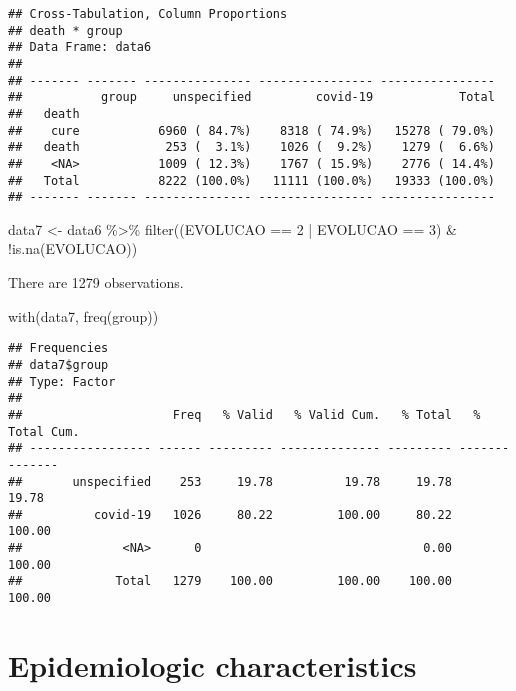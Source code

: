 \documentclass[
]{article}
\newenvironment{Shaded}{\begin{snugshade}}{\end{snugshade}}
\newcommand{\DecValTok}[1]{\textcolor[rgb]{0.00,0.00,0.81}{#1}}
\newcommand{\FunctionTok}[1]{\textcolor[rgb]{0.00,0.00,0.00}{#1}}
\newcommand{\NormalTok}[1]{#1}
\newcommand{\OtherTok}[1]{\textcolor[rgb]{0.56,0.35,0.01}{#1}}
\newcommand{\SpecialCharTok}[1]{\textcolor[rgb]{0.00,0.00,0.00}{#1}}
\begin{document}
\begin{verbatim}
## Cross-Tabulation, Column Proportions  
## death * group  
## Data Frame: data6  
## 
## ------- ------- --------------- ---------------- ----------------
##           group     unspecified         covid-19            Total
##   death                                                          
##    cure           6960 ( 84.7%)    8318 ( 74.9%)   15278 ( 79.0%)
##   death            253 (  3.1%)    1026 (  9.2%)    1279 (  6.6%)
##    <NA>           1009 ( 12.3%)    1767 ( 15.9%)    2776 ( 14.4%)
##   Total           8222 (100.0%)   11111 (100.0%)   19333 (100.0%)
## ------- ------- --------------- ---------------- ----------------
\end{verbatim}

\begin{Shaded}
\begin{Highlighting}[]
\NormalTok{data7 }\OtherTok{\textless{}{-}}\NormalTok{ data6 }\SpecialCharTok{\%\textgreater{}\%} 
  \FunctionTok{filter}\NormalTok{((EVOLUCAO }\SpecialCharTok{==} \DecValTok{2} \SpecialCharTok{|}\NormalTok{ EVOLUCAO }\SpecialCharTok{==} \DecValTok{3}\NormalTok{) }\SpecialCharTok{\&} \SpecialCharTok{!}\FunctionTok{is.na}\NormalTok{(EVOLUCAO))}
\end{Highlighting}
\end{Shaded}

There are 1279 observations.

\begin{Shaded}
\begin{Highlighting}[]
\FunctionTok{with}\NormalTok{(data7, }\FunctionTok{freq}\NormalTok{(group))}
\end{Highlighting}
\end{Shaded}

\begin{verbatim}
## Frequencies  
## data7$group  
## Type: Factor  
## 
##                     Freq   % Valid   % Valid Cum.   % Total   % Total Cum.
## ----------------- ------ --------- -------------- --------- --------------
##       unspecified    253     19.78          19.78     19.78          19.78
##          covid-19   1026     80.22         100.00     80.22         100.00
##              <NA>      0                               0.00         100.00
##             Total   1279    100.00         100.00    100.00         100.00
\end{verbatim}

\hypertarget{epidemiologic-characteristics}{%
\section{Epidemiologic
characteristics}\label{epidemiologic-characteristics}}
\end{document}
